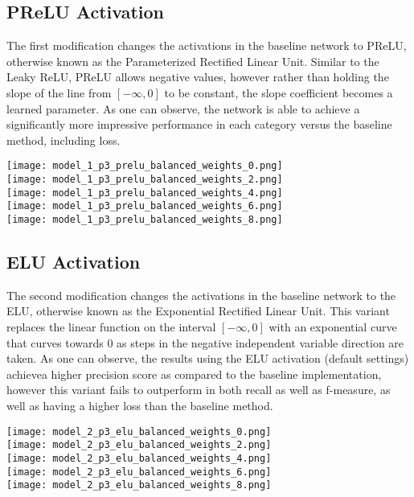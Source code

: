 \documentclass{article}
\begin{document}
\subsection*{PReLU Activation}
The first modification changes the activations in the baseline network to PReLU, otherwise known as the Parameterized Rectified Linear Unit. Similar to the Leaky ReLU, PReLU allows negative values, however rather than holding the slope of the line from $[-\infty,0]$ to be constant, the slope coefficient becomes a learned parameter. As one can observe, the network is able to achieve a significantly more impressive performance in each category versus the baseline method, including loss.
		
\texttt{[image: model\_1\_p3\_prelu\_balanced\_weights\_0.png]} \\
\texttt{[image: model\_1\_p3\_prelu\_balanced\_weights\_2.png]} \\
\texttt{[image: model\_1\_p3\_prelu\_balanced\_weights\_4.png]} \\
\texttt{[image: model\_1\_p3\_prelu\_balanced\_weights\_6.png]} \\
\texttt{[image: model\_1\_p3\_prelu\_balanced\_weights\_8.png]} \\

\subsection*{ELU Activation}
The second modification changes the activations in the baseline network to the ELU, otherwise known as the Exponential Rectified Linear Unit. This variant replaces the linear function on the interval $[-\infty,0]$ with an exponential curve that curves towards 0 as steps in the negative independent variable direction are taken. As one can observe, the results using the ELU activation (default settings) achievea higher precision score as compared to the baseline implementation, however this variant fails to outperform in both recall as well as f-measure, as well as having a higher loss than the baseline method.
		

\texttt{[image: model\_2\_p3\_elu\_balanced\_weights\_0.png]} \\
\texttt{[image: model\_2\_p3\_elu\_balanced\_weights\_2.png]} \\
\texttt{[image: model\_2\_p3\_elu\_balanced\_weights\_4.png]} \\
\texttt{[image: model\_2\_p3\_elu\_balanced\_weights\_6.png]} \\
\texttt{[image: model\_2\_p3\_elu\_balanced\_weights\_8.png]} \\
\end{document}
